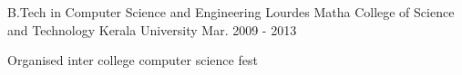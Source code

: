 

\begin{cventries}

  \cventry
    {B.Tech in Computer Science and Engineering } %
    {Lourdes Matha College of Science and Technology} %
    {Kerala University} %
    {Mar. 2009 - 2013} %
    {}
    {
      \begin{cvitems} %
        \item {Organised inter college computer science fest}
      \end{cvitems}
    }

\end{cventries}
